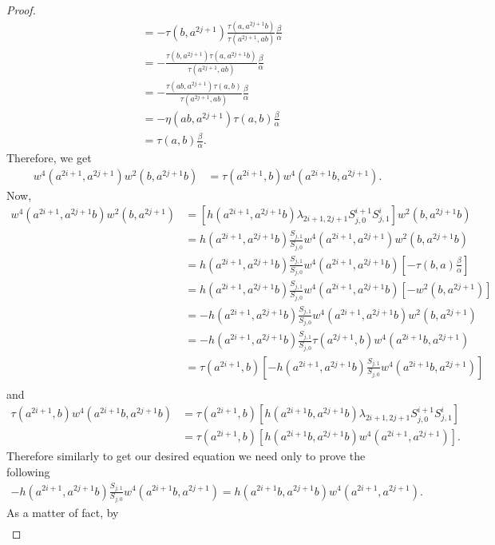 \documentclass[a4paper,11pt]{amsart}
\numberwithin{equation}{section}
\begin{document}
\begin{proof}
\begin{align*}
&=-\tau(b,a^{2j+1}) \frac{\tau(a,a^{2j+1}b)}{\tau(a^{2j+1},ab)} \frac{\beta}{\alpha}\\
&=-\frac{\tau(b,a^{2j+1}) \tau(a,a^{2j+1}b)}{\tau(a^{2j+1},ab)} \frac{\beta}{\alpha}\\
&=-\frac{\tau(ab,a^{2j+1}) \tau(a,b)}{\tau(a^{2j+1},ab)} \frac{\beta}{\alpha}\\
&=-\eta(ab,a^{2j+1}) \tau(a,b)\frac{\beta}{\alpha}\\
&=\tau(a,b)\frac{\beta}{\alpha}.
\end{align*}
Therefore, we get
\begin{align}
\label{light1} w^4(a^{2i+1},a^{2j+1}) w^2(b,a^{2j+1}b)&=\tau(a^{2i+1},b) w^4(a^{2i+1}b,a^{2j+1}).
\end{align}
Now,
\begin{align*}
w^4(a^{2i+1},a^{2j+1}b) w^2(b,a^{2j+1})&=[h(a^{2i+1},a^{2j+1}b) \lambda_{2i+1,2j+1} S_{j,0}^{i+1} S_{j,1}^i] w^2(b,a^{2j+1}b)\\
&=h(a^{2i+1},a^{2j+1}b) \frac{S_{j,1}}{S_{j,0}} w^4(a^{2i+1},a^{2j+1}) w^2(b,a^{2j+1}b)\\
&=h(a^{2i+1},a^{2j+1}b)\frac{S_{j,1}}{S_{j,0}} w^4(a^{2i+1},a^{2j+1}b) [-\tau(b,a) \frac{\beta}{\alpha}]\\
&=h(a^{2i+1},a^{2j+1}b) \frac{S_{j,1}}{S_{j,0}} w^4(a^{2i+1},a^{2j+1}b) [-w^2(b,a^{2j+1})]\\
&=-h(a^{2i+1},a^{2j+1}b) \frac{S_{j,1}}{S_{j,0}} w^4(a^{2i+1},a^{2j+1}b) w^2(b,a^{2j+1})\\
&=-h(a^{2i+1},a^{2j+1}b) \frac{S_{j,1}}{S_{j,0}} \tau(a^{2j+1},b) w^4(a^{2i+1}b,a^{2j+1})\\
&=\tau(a^{2i+1},b)[-h(a^{2i+1},a^{2j+1}b) \frac{S_{j,1}}{S_{j,0}} w^4(a^{2i+1}b,a^{2j+1})]\\
\end{align*}
and
\begin{align*}
\tau(a^{2i+1},b) w^4(a^{2i+1}b,a^{2j+1}b)&=\tau(a^{2i+1},b) [h(a^{2i+1}b,a^{2j+1}b) \lambda_{2i+1,2j+1} S_{j,0}^{i+1} S_{j,1}^{i}]\\
&=\tau(a^{2i+1},b) [h(a^{2i+1}b,a^{2j+1}b) w^4(a^{2i+1},a^{2j+1})].
\end{align*}
Therefore similarly to get our desired equation we need only to prove the following
\begin{align}
\label{light2} -h(a^{2i+1},a^{2j+1}b) \frac{S_{j,1}}{S_{j,0}} w^4(a^{2i+1}b,a^{2j+1})=h(a^{2i+1}b,a^{2j+1}b) w^4(a^{2i+1},a^{2j+1}).
\end{align}
As a matter of fact, by
\begin{align*}

\end{align*}
\end{proof}
\end{document}
